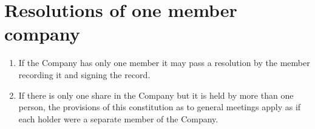 \section{Resolutions of one member company}

\begin{enumerate}[label=(\alph*)]
    \item If the Company has only one member it may pass a resolution by the member recording it and signing the record.
    
    \item If there is only one share in the Company but it is held by more than one person, the provisions of this constitution as to general meetings apply as if each holder were a separate member of the Company.
\end{enumerate} 